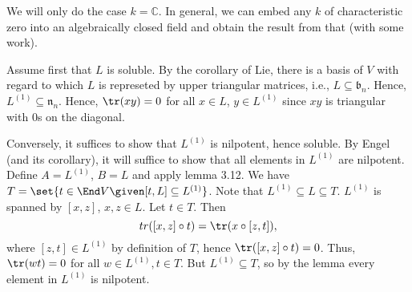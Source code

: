 We will only do the case $k = \mathbb{C}$. In general, we can embed any $k$ of
characteristic zero into an algebraically closed field and obtain the result from
that (with some work).

Assume first that $L$ is soluble. By the corollary of Lie, there is a basis of
$V$ with regard to which $L$ is represeted by upper triangular matrices, i.e.,
$L \subseteq \mathfrak{b}_n$. Hence, $L^{(1)} \subseteq \mathfrak{n}_n$. Hence,
$\tr(xy) = 0$ for all $x \in L$, $y \in L^{(1)}$ since $xy$ is triangular with
$0$s on the diagonal.

Conversely, it suffices to show that $L^{(1)}$ is nilpotent, hence soluble.
By Engel (and its corollary), it will suffice to show that all elements in
$L^{(1)}$ are nilpotent. Define $A = L^{(1)}$, $B = L$ and apply lemma 3.12.
We have $T = \set{t \in \End V\given [t, L] \subseteq L^{(1)}}$. Note
that $L^{(1)} \subseteq L \subseteq T$.
$L^{(1)}$ is spanned by $[x, z]$,  $x, z \in L$. Let $t \in T$. Then
\[ tr([x, z] \circ t) = \tr(x \circ [z, t]),\]
where $[z, t] \in L^{(1)}$ by definition of $T$, hence $\tr([x, z] \circ t) = 0$.
Thus, $\tr(wt) = 0$ for all $w \in L^{(1)}, t \in T$. But $L^{(1)} \subseteq T$,
so by the lemma every element in $L^{(1)}$ is nilpotent.

